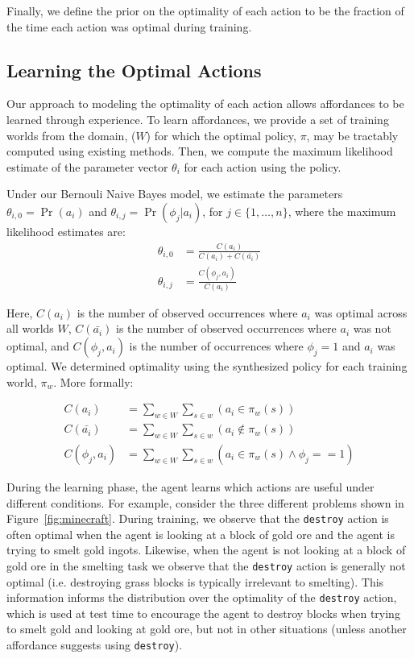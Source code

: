 \documentclass[letterpaper]{article}
\begin{document}
Finally, we define the prior on the optimality of each action to be
the fraction of the time each action was optimal during training.

\subsection{Learning the Optimal Actions}
Our approach to modeling the optimality of each action allows
affordances to be learned through experience.  To learn affordances,
we provide a set of training worlds from the domain, ($W$) for which
the optimal policy, $\pi$, may be tractably computed using existing
methods. Then, we compute the maximum likelihood estimate of the
parameter vector $\theta_i$ for each action using the policy.

Under our Bernouli Naive Bayes model, we estimate the parameters
$\theta_{i,0} = \Pr(a_i)$ and $\theta_{i,j} = \Pr(\phi_j | a_i)$, for $j \in \{1, \ldots, n \}$, where the maximum likelihood estimates are:
\begin{align}
\theta_{i,0} &= \frac{C(a_i)}{C(a_i) + C(\bar{a_i})} \\
\theta_{i,j} &= \frac{C(\phi_j, a_i)}{C(a_i)}
\end{align}

Here, $C(a_i)$ is the number of observed occurrences where $a_i$ was optimal across all worlds $W$,
$C(\bar{a_i})$ is the number of observed occurrences where $a_i$ was not optimal,
and $C(\phi_j, a_i)$ is the number of occurrences where $\phi_j=1$ and $a_i$ was optimal.
We determined optimality using the synthesized policy for each training world, $\pi_w$. More formally:

\begin{align}
C(a_i) &= \sum_{w \in W} \sum_{s \in w} (a_i \in \pi_w(s)) \\
C(\bar{a_i}) &= \sum_{w \in W} \sum_{s \in w} (a_i \not \in \pi_w(s) ) \\
C(\phi_j, a_i) &= \sum_{w \in W} \sum_{s \in w} (a_i  \in \pi_w(s) \wedge \phi_j == 1)
\end{align}

During the learning phase, the agent learns which actions are useful
under different conditions.  For example, consider the three different
problems shown in Figure~\ref{fig:minecraft}.  During training, we observe
that the \texttt{destroy} action is often optimal when the agent is
looking at a block of gold ore and the agent is trying to smelt gold
ingots.  Likewise, when the agent is not looking at a block of gold
ore in the smelting task we observe that the \texttt{destroy} action
is generally not optimal (i.e. destroying grass blocks is typically
irrelevant to smelting).  This information informs the distribution
over the optimality of the \texttt{destroy} action, which is used at
test time to encourage the agent to destroy blocks when trying to
smelt gold and looking at gold ore, but not in other situations
(unless another affordance suggests using \texttt{destroy}).
\end{document}
